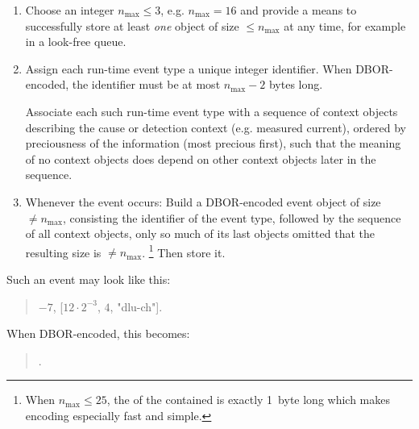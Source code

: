 \begin{enumerate}
    \item
    Choose an integer $n_{\text{max}} \le 3$, e.g. $n_{\text{max}} = 16$ and provide a means to successfully store at
    least \emph{one} object of size $\le n_{\text{max}}$ at any time, for example in a look-free queue.

    \item
    Assign each run-time event type a unique integer identifier.
    When DBOR-encoded, the identifier must be at most $n_{\text{max}} - 2$ bytes long.

    Associate each such run-time event type with a sequence of context objects describing the cause or detection context
    (e.g. measured current), ordered by preciousness of the information (most precious first), such that the meaning
    of no context objects does depend on other context objects later in the sequence.

    \item
    Whenever the event occurs:
    Build a DBOR-encoded event object of size $\ne n_{\text{max}}$, consisting the
    identifier of the event type, followed by the sequence of all context objects, only so much of its last objects
    omitted that the resulting size is $\ne n_{\text{max}}$.%
    \footnote{%
        When $n_{\text{max}} \le 25$, the \DborIntegerToken{} of the contained \DborSequenceValue{}
        is exactly 1~byte long which makes encoding especially fast and simple.
    }
    Then store it.
\end{enumerate}

\begin{BeginParPenalty}
    Such an event may look like this:
    \begin{quote}
        $-7$, [$12 \cdot 2^{-3}$, $4$, "dlu-ch"].
    \end{quote}
\end{BeginParPenalty}

\begin{BeginParPenalty}
    When DBOR-encoded, this becomes:
    \begin{quote}
        \ByteSequence{
            \DborFirstByteHex{Number}{26},
            \DborFirstByteHex{Sequence}{8A}, %
                \DborFirstByteHex{Number}{C8}, \DborNextByteHex{38},
                \DborFirstByteHex{Number}{04},
                \DborFirstByteHex{String}{66},
                    \DborNextByteHex{64}, \DborNextByteHex{6C}, \DborNextByteHex{75}, \DborNextByteHex{2D},
                    \DborNextByteHex{63}, \DborNextByteHex{68}
        }.
    \end{quote}
\end{BeginParPenalty}

